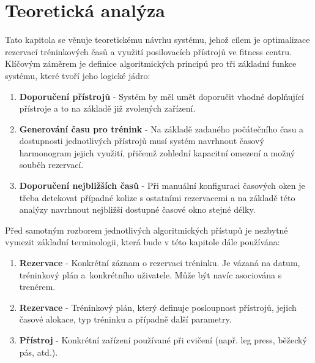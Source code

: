 \chapter{Teoretická analýza} \label{theoreticalAnalysis}
Tato kapitola se věnuje teoretickému návrhu systému, jehož cílem je optimalizace rezervací tréninkových časů a využití posilovacích přístrojů ve fitness centru. Klíčovým záměrem je definice algoritmických principů pro tři základní funkce systému, které tvoří jeho logické jádro:

\begin{enumerate}
    \item \textbf{Doporučení přístrojů} - Systém by měl umět doporučit vhodné doplňující přístroje a to na základě již zvolených zařízení.
    \item \textbf{Generování času pro trénink} - Na základě zadaného počátečního času a dostupnosti jednotlivých přístrojů musí systém navrhnout časový harmonogram jejich využití, přičemž zohlední kapacitní omezení a možný souběh rezervací.
    \item \textbf{Doporučení nejbližších časů} - Při manuální konfiguraci časových oken je třeba detekovat případné kolize s ostatními rezervacemi a na základě této analýzy navrhnout nejbližší dostupné časové okno stejné délky.
\end{enumerate}

Před samotným rozborem jednotlivých algoritmických přístupů je nezbytné vymezit základní terminologii, která bude v této kapitole dále používána:
\begin{enumerate}
    \item \textbf{Rezervace} - Konkrétní záznam o rezervaci tréninku. Je vázaná na datum, tréninkový plán a~konkrétního uživatele. Může být navíc asociována s trenérem.
    \item \textbf{Rezervace} - Tréninkový plán, který definuje posloupnost přístrojů, jejich časové alokace, typ tréninku a případně další parametry.
    \item \textbf{Přístroj} - Konkrétní zařízení používané při cvičení (např. leg press, běžecký pás, atd.).
\end{enumerate}

